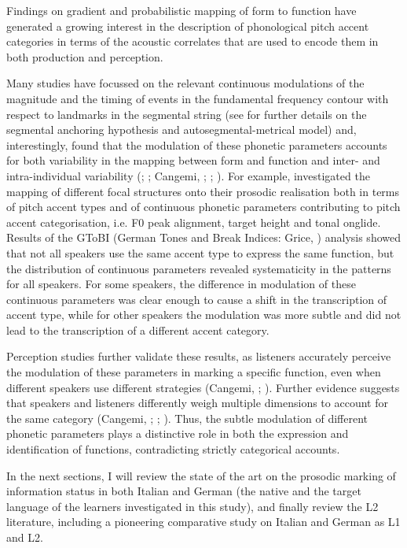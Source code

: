 Findings on gradient and probabilistic mapping of form to function have generated a growing interest in the description of phonological pitch accent categories in terms of the acoustic correlates that are used to encode them in both production and perception.

Many studies have focussed on the relevant continuous modulations of the magnitude and the timing of events in the fundamental frequency contour with respect to landmarks in the segmental string (see  for further details on the segmental anchoring hypothesis and autosegmental-metrical model) and, interestingly, found that the modulation of these phonetic parameters accounts for both variability in the mapping between form and function and inter- and intra-individual variability (\citealt{CangemiEtAl2016}; \citealt{CangemiGrice2016}; Cangemi, \citealt{KrügerGrice2015}; \citealt{GriceEtAl2017}; \citealt{MückeGrice2014}). For example, \citet{GriceEtAl2017} investigated the mapping of different focal structures onto their prosodic realisation both in terms of pitch accent types and of continuous phonetic parameters contributing to pitch accent categorisation, i.e. F0 peak alignment, target height and tonal onglide. Results of the GToBI (German Tones and Break Indices: Grice, \citealt{BaumannBenzmüller2005}) analysis showed that not all speakers use the same accent type to express the same function, but the distribution of continuous parameters revealed systematicity in the patterns for all speakers. For some speakers, the difference in modulation of these continuous parameters was clear enough to cause a shift in the transcription of accent type, while for other speakers the modulation was more subtle and did not lead to the transcription of a different accent category.

Perception studies further validate these results, as listeners accurately perceive the modulation of these parameters in marking a specific function, even when different speakers use different strategies (Cangemi, \citealt{KrügerGrice2015}; \citealt{GriceEtAl2017}). Further evidence suggests that speakers and listeners differently weigh multiple dimensions to account for the same category (Cangemi, \citealt{KrügerGrice2015}; \citealt{GriceEtAl2017}; \citealt{NiebuhrEtAl2011}). Thus, the subtle modulation of different phonetic parameters plays a distinctive role in both the expression and identification of functions, contradicting strictly categorical accounts.

In the next sections, I will review the state of the art on the prosodic marking of information status in both Italian and German (the native and the target language of the learners investigated in this study), and finally review the L2 literature, including a pioneering comparative study on Italian and German as L1 and L2.

